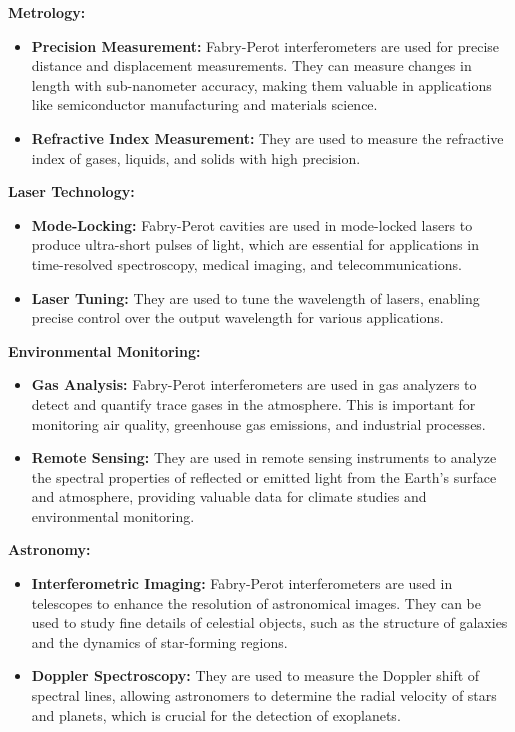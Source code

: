 \documentclass[
  a4paper,
]{book}
\providecommand{\tightlist}{%
  \setlength{\itemsep}{0pt}\setlength{\parskip}{0pt}}
\begin{document}
\begin{tcolorbox}
\textbf{Metrology:}

\begin{itemize}
\tightlist
\item
  \textbf{Precision Measurement:} Fabry-Perot interferometers are used
  for precise distance and displacement measurements. They can measure
  changes in length with sub-nanometer accuracy, making them valuable in
  applications like semiconductor manufacturing and materials science.
\item
  \textbf{Refractive Index Measurement:} They are used to measure the
  refractive index of gases, liquids, and solids with high precision.
\end{itemize}

\textbf{Laser Technology:}

\begin{itemize}
\tightlist
\item
  \textbf{Mode-Locking:} Fabry-Perot cavities are used in mode-locked
  lasers to produce ultra-short pulses of light, which are essential for
  applications in time-resolved spectroscopy, medical imaging, and
  telecommunications.
\item
  \textbf{Laser Tuning:} They are used to tune the wavelength of lasers,
  enabling precise control over the output wavelength for various
  applications.
\end{itemize}

\textbf{Environmental Monitoring:}

\begin{itemize}
\tightlist
\item
  \textbf{Gas Analysis:} Fabry-Perot interferometers are used in gas
  analyzers to detect and quantify trace gases in the atmosphere. This
  is important for monitoring air quality, greenhouse gas emissions, and
  industrial processes.
\item
  \textbf{Remote Sensing:} They are used in remote sensing instruments
  to analyze the spectral properties of reflected or emitted light from
  the Earth's surface and atmosphere, providing valuable data for
  climate studies and environmental monitoring.
\end{itemize}

\textbf{Astronomy:}

\begin{itemize}
\tightlist
\item
  \textbf{Interferometric Imaging:} Fabry-Perot interferometers are used
  in telescopes to enhance the resolution of astronomical images. They
  can be used to study fine details of celestial objects, such as the
  structure of galaxies and the dynamics of star-forming regions.
\item
  \textbf{Doppler Spectroscopy:} They are used to measure the Doppler
  shift of spectral lines, allowing astronomers to determine the radial
  velocity of stars and planets, which is crucial for the detection of
  exoplanets.
\end{itemize}


\end{tcolorbox}
\end{document}
